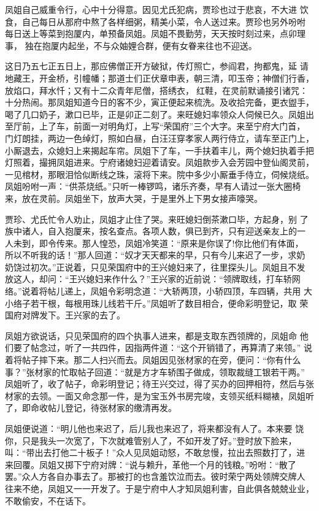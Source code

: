 凤姐自己威重令行，心中十分得意。因见尤氏犯病，贾珍也过于悲哀，不大进
饮食，自己每日从那府中熬了各样细粥，精美小菜，令人送过来。贾珍也另外吩咐
每日送上等菜到抱厦内，单预备凤姐。凤姐不畏勤劳，天天按时刻过来，点卯理事，
独在抱厦内起坐，不与众妯娌合群，便有女眷来往也不迎送。

这日乃五七正五日上，那应佛僧正开方破狱，传灯照亡，参阎君，拘都鬼，延
请地藏王，开金桥，引幢幡；那道士们正伏章申表，朝三清，叩玉帝；神僧们行香，
放焰口，拜水忏；又有十二众青年尼僧，搭绣衣，红鞋，在灵前默诵接引诸咒：
十分热闹。那凤姐知道今日的客不少，寅正便起来梳洗。及收拾完备，更衣盥手，
喝了几口奶子，漱口已毕，正是卯正二刻了。来旺媳妇率领众人伺候已久。凤姐出
至厅前，上了车，前面一对明角灯，上写“荣国府”三个大字。来至宁府大门首，
门灯朗挂，两边一色绰灯，照如白昼，白汪汪穿孝家人两行侍立，请车至正门上，
小厮退去，众媳妇上来揭起车帘。凤姐下了车，一手扶着丰儿，两个媳妇执着手把
灯照着，撮拥凤姐进来。宁府诸媳妇迎着请安。凤姐款步入会芳园中登仙阁灵前，
一见棺材，那眼泪恰似断线之珠，滚将下来。院中多少小厮垂手侍立，伺候烧纸。
凤姐吩咐一声：“供茶烧纸。”只听一棒锣鸣，诸乐齐奏，早有人请过一张大圈椅
来，放在灵前。凤姐坐下，放声大哭，于是里外上下男女接声嚎哭。

贾珍、尤氏忙令人劝止，凤姐才止住了哭。来旺媳妇倒茶漱口毕，方起身，别
了族中诸人，自入抱厦来，按名查点。各项人数，俱已到齐，只有迎送亲友上的一
人未到，即令传来。那人惶恐，凤姐冷笑道：“原来是你误了!你比他们有体面，
所以不听我的话！”那人回道：“奴才天天都来的早，只有今儿来迟了一步，求奶
奶饶过初次。”正说着，只见荣国府中的王兴媳妇来了，往里探头儿。凤姐且不发
放这人，却问：“王兴媳妇来作什么？”王兴家的近前说：“领牌取线，打车轿网
络。”说着将帖儿递上，凤姐令彩明念道：“大轿两顶，小轿四顶，车四辆，共用
大小络子若干根，每根用珠儿线若干斤。”凤姐听了数目相合，便命彩明登记，取
荣国府对牌发下。王兴家的去了。

凤姐方欲说话，只见荣国府的四个执事人进来，都是支取东西领牌的，凤姐命
他们要了帖念过，听了一共四件，因指两件道：“这个开销错了，再算清了来领。”
说着将帖子摔下来。那二人扫兴而去。凤姐因见张材家的在旁，便问：“你有什么
事？”张材家的忙取帖子回道：“就是方才车轿围子做成，领取裁缝工银若干两。”
凤姐听了，收了帖子，命彩明登记；待王兴交过，得了买办的回押相符，然后与张
材家的去领。一面又命念那一件，是为宝玉外书房完竣，支领买纸料糊裱，凤姐听
了，即命收帖儿登记，待张材家的缴清再发。

凤姐便说道：“明儿他也来迟了，后儿我也来迟了，将来都没有人了。本来要
饶你，只是我头一次宽了，下次就难管别人了，不如开发了好。”登时放下脸来，
叫：“带出去打他二十板子！”众人见凤姐动怒，不敢怠慢，拉出去照数打了，进
来回覆。凤姐又掷下宁府对牌：“说与赖升，革他一个月的钱粮。”吩咐：“散了
罢。”众人方各自办事去了。那被打的也含羞饮泣而去。彼时荣宁两处领牌交牌人
往来不绝，凤姐又一一开发了。于是宁府中人才知凤姐利害，自此俱各兢兢业业，
不敢偷安，不在话下。

